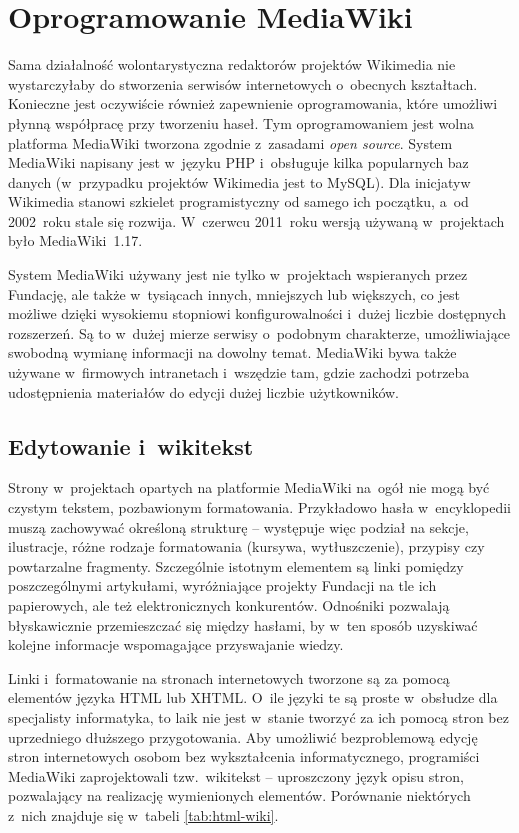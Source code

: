 \documentclass{pracamgr}
\begin{document}
\section{Oprogramowanie MediaWiki}
Sama działalność wolontarystyczna redaktorów projektów Wikimedia nie wystarczyłaby do stworzenia serwisów internetowych o~obecnych kształtach. Konieczne jest oczywiście również zapewnienie oprogramowania, które umożliwi płynną współpracę przy tworzeniu haseł. Tym oprogramowaniem jest wolna platforma MediaWiki tworzona zgodnie z~zasadami \emph{open source}. System MediaWiki napisany jest w~języku PHP i~obsługuje kilka popularnych baz danych (w~przypadku projektów Wikimedia jest to MySQL). Dla inicjatyw Wikimedia stanowi szkielet programistyczny od samego ich początku, a~od 2002~roku stale się rozwija. W~czerwcu 2011~roku wersją używaną w~projektach było MediaWiki~1.17.

System MediaWiki używany jest nie tylko w~projektach wspieranych przez Fundację, ale także w~tysiącach innych, mniejszych lub większych, co jest możliwe dzięki wysokiemu stopniowi konfigurowalności i~dużej liczbie dostępnych rozszerzeń. Są to w~dużej mierze serwisy o~podobnym charakterze, umożliwiające swobodną wymianę informacji na dowolny temat. MediaWiki bywa także używane w~firmowych intranetach i~wszędzie tam, gdzie zachodzi potrzeba udostępnienia materiałów do edycji dużej liczbie użytkowników.

\subsection{Edytowanie i~wikitekst}
Strony w~projektach opartych na platformie MediaWiki na~ogół nie mogą być czystym tekstem, pozbawionym formatowania. Przykładowo hasła w~encyklopedii muszą zachowywać określoną strukturę -- występuje więc podział na sekcje, ilustracje, różne rodzaje formatowania (kursywa, wytłuszczenie), przypisy czy powtarzalne fragmenty. Szczególnie istotnym elementem są linki pomiędzy poszczególnymi artykułami, wyróżniające projekty Fundacji na tle ich papierowych, ale też elektronicznych konkurentów. Odnośniki pozwalają błyskawicznie przemieszczać się między hasłami, by w~ten sposób uzyskiwać kolejne informacje wspomagające przyswajanie wiedzy.

Linki i~formatowanie na stronach internetowych tworzone są za pomocą elementów języka HTML lub XHTML. O~ile języki te są proste w~obsłudze dla specjalisty informatyka, to laik nie jest w~stanie tworzyć za ich pomocą stron bez uprzedniego dłuższego przygotowania. Aby umożliwić bezproblemową edycję stron internetowych osobom bez wykształcenia informatycznego, programiści MediaWiki zaprojektowali tzw.\ wikitekst -- uproszczony język opisu stron, pozwalający na realizację wymienionych elementów. Porównanie niektórych z~nich znajduje się w~tabeli \ref{tab:html-wiki}.
\end{document}
